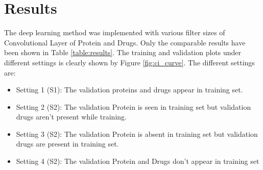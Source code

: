 \section{Results}

The deep learning method was implemented with various filter sizes of Convolutional Layer of Protein and Drugs. Only the comparable results have been shown in Table \ref{table:results}. The training and validation plots under different settings is clearly shown by Figure \ref{fig:ci_curve}. The different settings are:
\begin{itemize}
    \item Setting 1 (S1): The validation proteins and drugs appear in training set.
    \item Setting 2 (S2): The validation Protein is seen in training set but validation drugs aren't present while training.
    \item Setting 3 (S2): The validation Protein is absent in training set but validation drugs are present in training set.
    \item Setting 4 (S2): The validation Protein and Drugs don't appear in training set
\end{itemize}

